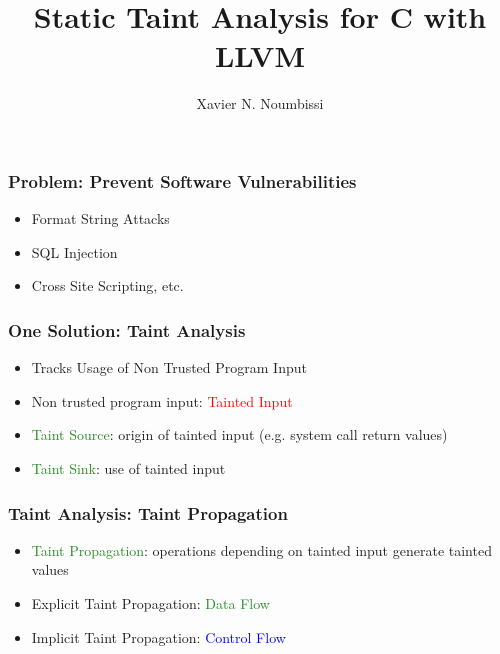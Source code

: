 \documentclass[xcolor=dvipsnames]{beamer}
\title[Static Taint Analysis for C with LLVM]
{Static Taint Analysis for C with LLVM}
\author[]{Xavier N. Noumbissi}
\institute[ECE Graduate Research Seminar]{Department of Electrical and Computer Engineering\\ University of Waterloo}
\date{}
\begin{document}
\begin{frame}
  \titlepage
\end{frame}


\begin{frame}
  \frametitle{Problem: Prevent Software Vulnerabilities} {\Large	
	\begin{itemize}
	 \item Format String Attacks
	 \vspace{0.5cm}
	 \item SQL Injection
	 \vspace{0.5cm}
	 \item Cross Site Scripting, etc.
	\end{itemize}  
	}
\end{frame}

\begin{frame}
  \frametitle{One Solution: Taint Analysis} {\large
   \begin{itemize}
	\item Tracks Usage of Non Trusted Program Input
   	\vspace{0.5cm}	   
	\item Non trusted program input: \textcolor{red}{Tainted Input}
   	\vspace{0.5cm}	
	\item \textcolor{forestgreen}{Taint Source}: origin of tainted input (e.g. system call return values)
   	\vspace{0.5cm}
	\item \textcolor{forestgreen}{Taint Sink}: use of tainted input
	\end{itemize}
	}
\end{frame}

\begin{frame}
  \frametitle{Taint Analysis: Taint Propagation} {\large
   \begin{itemize}
   	\item \textcolor{forestgreen}{Taint Propagation}: operations depending on tainted input generate tainted values
   	\vspace{0.5cm}	   	
   	\item Explicit Taint Propagation: \textcolor{forestgreen}{Data Flow}
   	\vspace{0.5cm}	
	\item Implicit Taint Propagation: \textcolor{blue}{Control Flow}   	
	\end{itemize}
	}
\end{frame}
\end{document}
